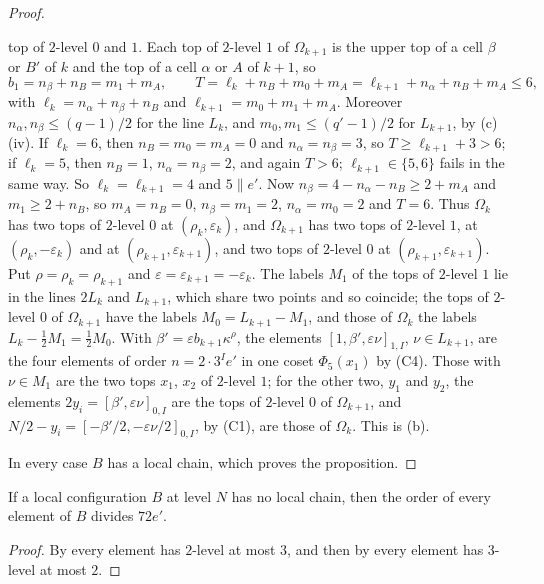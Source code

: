 \begin{proof}
\begin{itemize}
top of $2$-level $0$ and $1$. Each top of $2$-level $1$ of $\Omega_{k+1}$ is
the upper top of a cell $\beta$ or $B'$ of $k$ and the top of a cell $\alpha$
or $A$ of $k+1$, so
\[
  b_{1}=n_{\beta}+n_{B}=m_{1}+m_{A},\qquad
  T=\ell_{k}+n_{B}+m_{0}+m_{A}=\ell_{k+1}+n_{\alpha}+n_{B}+m_{A}\le6,
\]
with $\ell_{k}=n_{\alpha}+n_{\beta}+n_{B}$ and $\ell_{k+1}=m_{0}+m_{1}+m_{A}$.
Moreover $n_{\alpha},n_{\beta}\le(q-1)/2$ for the line $L_{k}$, and
$m_{0},m_{1}\le(q'-1)/2$ for $L_{k+1}$, by (c)(iv). If
$\ell_{k}=6$, then $n_{B}=m_{0}=m_{A}=0$ and $n_{\alpha}=n_{\beta}=3$, so
$T\ge\ell_{k+1}+3>6$; if $\ell_{k}=5$, then $n_{B}=1$, $n_{\alpha}=n_{\beta}
=2$, and again $T>6$; $\ell_{k+1}\in\{5,6\}$ fails in the same way. So
$\ell_{k}=\ell_{k+1}=4$ and $5\parallel e'$. Now $n_{\beta}=4-n_{\alpha}-
n_{B}\ge2+m_{A}$ and $m_{1}\ge2+n_{B}$, so $m_{A}=n_{B}=0$,
$n_{\beta}=m_{1}=2$, $n_{\alpha}=m_{0}=2$ and $T=6$. Thus $\Omega_{k}$ has two
tops of $2$-level $0$ at $(\rho_{k},\varepsilon_{k})$, and $\Omega_{k+1}$ has
two tops of $2$-level $1$, at $(\rho_{k},-\varepsilon_{k})$ and at
$(\rho_{k+1},\varepsilon_{k+1})$, and two tops of $2$-level $0$ at
$(\rho_{k+1},\varepsilon_{k+1})$. Put $\rho=\rho_{k}=\rho_{k+1}$ and
$\varepsilon=\varepsilon_{k+1}=-\varepsilon_{k}$. The labels $M_{1}$ of the
tops of $2$-level $1$ lie in the lines $2L_{k}$ and $L_{k+1}$, which share two
points and so coincide; the tops of $2$-level $0$ of $\Omega_{k+1}$ have the
labels $M_{0}=L_{k+1}-M_{1}$, and those of $\Omega_{k}$ the labels
$L_{k}-\frac12M_{1}=\frac12M_{0}$. With $\beta'=\varepsilon b_{k+1}
\kappa^{\rho}$, the elements $[1,\beta',\varepsilon\nu]_{1,I}$, $\nu\in
L_{k+1}$, are the four elements of order $n=2\cdot3^{I}e'$ in one coset
$\Phi_{5}(x_{1})$ by (C4). Those with $\nu\in M_{1}$ are the two tops $x_{1}$,
$x_{2}$ of $2$-level $1$; for the other two, $y_{1}$ and $y_{2}$, the elements
$2y_{i}=[\beta',\varepsilon\nu]_{0,I}$ are the tops of $2$-level $0$ of
$\Omega_{k+1}$, and $N/2-y_{i}=[-\beta'/2,-\varepsilon\nu/2]_{0,I}$, by (C1),
are those of $\Omega_{k}$. This is (b).
\end{itemize}
In every case $B$ has a local chain, which proves the proposition.
\end{proof}

\begin{corollary}\label{cor:seventytwo}
If a local configuration $B$ at level $N$ has no local chain, then the order
of every element of $B$ divides $72e'$.
\end{corollary}

\begin{proof}
By  every element has $2$-level at most $3$, and then by
 every element has $3$-level at most $2$.
\end{proof}
